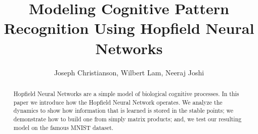\documentclass[]{article}
\title{Modeling Cognitive Pattern Recognition Using Hopfield Neural Networks}
\author{Joseph Christianson, Wilbert Lam, Neeraj Joshi}
\begin{document}
\maketitle

\begin{abstract}
Hopfield Neural Networks are a simple model of biological cognitive processes. In this paper we introduce how the Hopfield Neural Network operates. We analyze the dynamics to show how information that is learned is stored in the stable points; we demonstrate how to build one from simply matrix products; and, we test our resulting model on the famous MNIST dataset. 
\end{abstract}
\end{document}
